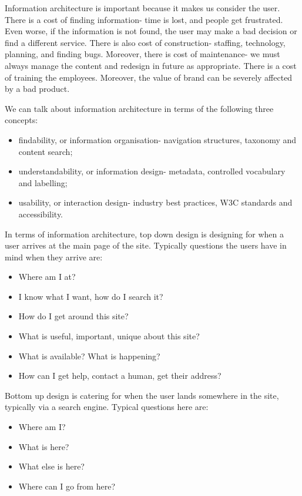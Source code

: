 \documentclass[a4paper, openany]{memoir}
\begin{document}
Information architecture is important because it makes us consider the user. There is a cost of finding information- time is lost, and people get frustrated. Even worse, if the information is not found, the user may make a bad decision or find a different service. There is also cost of construction- staffing, technology, planning, and finding bugs. Moreover, there is cost of maintenance- we must always manage the content and redesign in future as appropriate. There is a cost of training the employees. Moreover, the value of brand can be severely affected by a bad product.

We can talk about information architecture in terms of the following three concepts:
\begin{itemize}
    \item findability, or information organisation- navigation structures, taxonomy and content search;
    \item understandability, or information design- metadata, controlled vocabulary and labelling;
    \item usability, or interaction design- industry best practices, W3C standards and accessibility.
\end{itemize}

In terms of information architecture, top down design is designing for when a user arrives at the main page of the site. Typically questions the users have in mind when they arrive are:
\begin{itemize}
    \item Where am I at?
    \item I know what I want, how do I search it?
    \item How do I get around this site?
    \item What is useful, important, unique about this site?
    \item What is available? What is happening?
    \item How can I get help, contact a human, get their address?
\end{itemize}

Bottom up design is catering for when the user lands somewhere in the site, typically via a search engine. Typical questions here are:
\begin{itemize}
    \item Where am I?
    \item What is here?
    \item What else is here?
    \item Where can I go from here?
\end{itemize}
\end{document}
